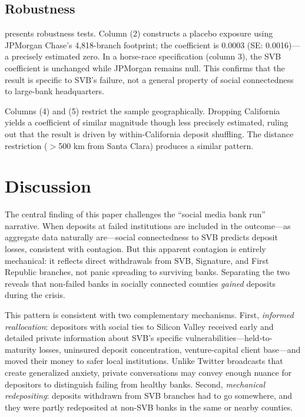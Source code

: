 \documentclass[12pt]{article}
\begin{document}


\subsection{Robustness}

 presents robustness tests. Column (2) constructs a placebo exposure using JPMorgan Chase's 4,818-branch footprint; the coefficient is 0.0003 (SE: 0.0016)---a precisely estimated zero. In a horse-race specification (column 3), the SVB coefficient is unchanged while JPMorgan remains null. This confirms that the result is specific to SVB's failure, not a general property of social connectedness to large-bank headquarters.

Columns (4) and (5) restrict the sample geographically. Dropping California yields a coefficient of similar magnitude though less precisely estimated, ruling out that the result is driven by within-California deposit shuffling. The distance restriction ($>$500 km from Santa Clara) produces a similar pattern.



\section{Discussion}

The central finding of this paper challenges the ``social media bank run'' narrative. When deposits at failed institutions are included in the outcome---as aggregate data naturally are---social connectedness to SVB predicts deposit losses, consistent with contagion. But this apparent contagion is entirely mechanical: it reflects direct withdrawals from SVB, Signature, and First Republic branches, not panic spreading to surviving banks. Separating the two reveals that non-failed banks in socially connected counties \textit{gained} deposits during the crisis.

This pattern is consistent with two complementary mechanisms. First, \textit{informed reallocation}: depositors with social ties to Silicon Valley received early and detailed private information about SVB's specific vulnerabilities---held-to-maturity losses, uninsured deposit concentration, venture-capital client base---and moved their money to safer local institutions. Unlike Twitter broadcasts that create generalized anxiety, private conversations may convey enough nuance for depositors to distinguish failing from healthy banks. Second, \textit{mechanical redepositing}: deposits withdrawn from SVB branches had to go somewhere, and they were partly redeposited at non-SVB banks in the same or nearby counties.
\end{document}
